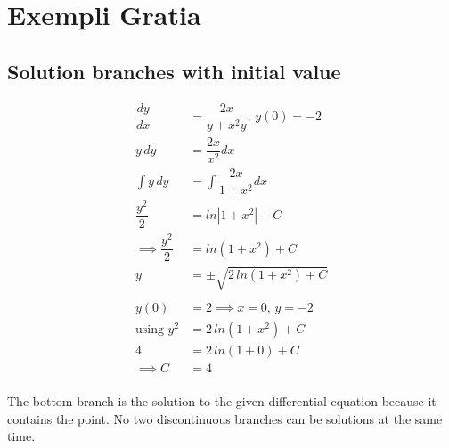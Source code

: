 \documentclass{article}
\begin{document}
\section{Exempli Gratia}

\subsection{Solution branches with initial value}

\begin{align*}
	\dfrac{dy}{dx}&=\dfrac{2x}{y+x^2y},\,y(0)=-2\\
	y\,dy&=\dfrac{2x}{x^2}dx\\
	\int y\,dy&=\int\dfrac{2x}{1+x^2}dx\\
	\dfrac{y^2}{2}&=ln|1+x^2|+C\\
	\implies\dfrac{y^2}{2}&=ln(1+x^2)+C\\
	y&=\pm\sqrt{2\,ln(1+x^2)+C}\\\\
	y(0)&=2\implies x=0,\,y=-2\\
	\text{using }y^2&=2\,ln(1+x^2)+C\\
	4&=2\,ln(1+0)+C\\
	\implies C&=4\\
\end{align*}
\begin{center}
\end{center}
The bottom branch is the solution to the given differential equation because it contains the point. No two discontinuous branches can be solutions at the same time.
\end{document}
